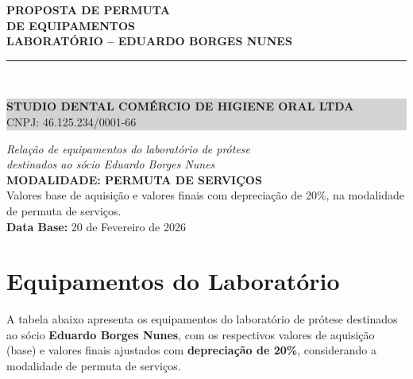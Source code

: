 \documentclass[12pt, a4paper]{article}
\begin{document}
\begin{titlepage}
    \centering
    \vspace*{3cm}
    {\Huge \textbf{\textcolor{primaryColor}{PROPOSTA DE PERMUTA}}} \\
    \vspace{0.5cm}
    {\Huge \textbf{\textcolor{primaryColor}{DE EQUIPAMENTOS}}} \\
    \vspace{0.5cm}
    {\Large \textbf{LABORATÓRIO -- EDUARDO BORGES NUNES}} \\
    \vspace{2cm}
    \rule{10cm}{1.5pt} \\
    \vspace{0.5cm}
    \colorbox{lightGray}{%
        \parbox{0.9\textwidth}{%
            \centering
            \vspace{0.3cm}
            {\Large \textbf{STUDIO DENTAL COMÉRCIO DE HIGIENE ORAL LTDA}} \\
            \vspace{0.3cm}
            {\large CNPJ: 46.125.234/0001-66} \\
            \vspace{0.3cm}
        }%
    }
    \vspace{3cm}

    {\Large \textit{Relação de equipamentos do laboratório de prótese}} \\
    \vspace{0.3cm}
    {\Large \textit{destinados ao sócio Eduardo Borges Nunes}} \\
    \vspace{0.3cm}
    {\large \textcolor{accentColor}{\textbf{MODALIDADE: PERMUTA DE SERVIÇOS}}} \\

    \vfill
    {\small Valores base de aquisição e valores finais com depreciação de 20\%, na modalidade de permuta de serviços.} \\
    \vspace{1cm}
    \textbf{Data Base:} 20 de Fevereiro de 2026
\end{titlepage}

\section{Equipamentos do Laboratório}

A tabela abaixo apresenta os equipamentos do laboratório de prótese destinados ao sócio \textbf{Eduardo Borges Nunes}, com os respectivos valores de aquisição (base) e valores finais ajustados com \textbf{depreciação de 20\%}, considerando a modalidade de permuta de serviços.
\end{document}
